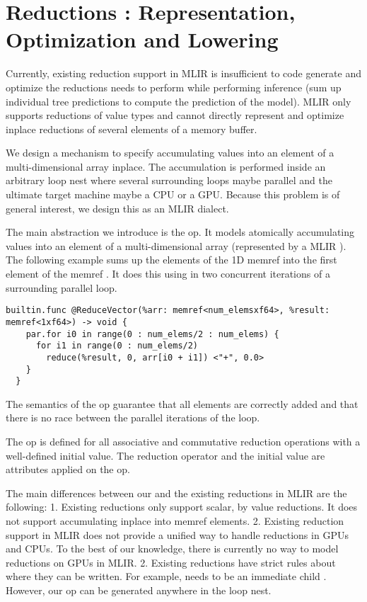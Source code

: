 \section{Reductions : Representation, Optimization and Lowering}

Currently, existing reduction support in MLIR is insufficient 
to code generate and optimize the reductions \Treebeard{} needs
to perform while performing inference (sum up individual 
tree predictions to compute the prediction of the model). 
MLIR only supports reductions of value types and cannot 
directly represent and optimize inplace reductions of 
several elements of a memory buffer. 

We design a mechanism to specify accumulating values into
an element of a multi-dimensional array inplace. 
The accumulation is performed inside an arbitrary 
loop nest where several surrounding loops maybe parallel and 
the ultimate target machine maybe a CPU or a GPU. Because this problem 
is of general interest, we design this as an MLIR dialect. 

The main abstraction we introduce is the  op. It models 
atomically accumulating values into an element of a 
multi-dimensional array (represented by a MLIR ).
The following example sums up the elements of the 1D memref 
into the first element of the memref . It does this
using in two concurrent iterations of a surrounding 
parallel loop.

\begin{lstlisting}[style=c++]
  builtin.func @ReduceVector(%arr: memref<num_elemsxf64>, %result: memref<1xf64>) -> void {
    par.for i0 in range(0 : num_elems/2 : num_elems) {
      for i1 in range(0 : num_elems/2) 
        reduce(%result, 0, arr[i0 + i1]) <"+", 0.0>
    }
  }
\end{lstlisting}

The semantics of the  op guarantee that all elements are 
correctly added and that there is no race between the parallel 
iterations of the loop.

The  op is defined for all associative and commutative
reduction operations with a well-defined initial value. The 
reduction operator and the initial value are attributes applied
on the  op. 

The main differences between our  and the existing 
reductions in MLIR are the following:
1. Existing reductions only support scalar, by value reductions. 
It does not support accumulating inplace into memref elements.
2. Existing reduction support in MLIR does not provide a unified
way to handle reductions in GPUs and CPUs. To the best of our 
knowledge, there is currently no way to model reductions on GPUs
in MLIR.
2. Existing reductions have strict rules about where they can be 
written. For example,  needs to be an immediate 
child . However, our  op can be
generated anywhere in the loop nest. 

